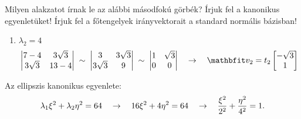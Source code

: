 \documentclass[exercise]{math-standalone}
\begin{document}
\begin{exercise}{%
    Milyen alakzatot írnak le az alábbi másodfokú görbék?
    Írjuk fel a kanonikus egyenletüket!
    Írjuk fel a főtengelyek irányvektorait a standard normális bázisban!
  }
{\begin{enumerate}[a)]
\begin{enumerate}[1)]
\[\begin{vmatrix}
                        -9         & 3 \sqrt{3} \\
                        3 \sqrt{3} & -3
                      \end{vmatrix} \;\sim\; \begin{vmatrix}
                        -\sqrt{3} & 1 \\
                        0         & 0
                      \end{vmatrix}
                      \quad \rightarrow \quad
                      \rvec v_1 = t_1 \begin{bmatrix}
                        1 \\ \sqrt{3}
                      \end{bmatrix}
                    \]
              \item $\lambda_2 = 4$
                    \[
                      \begin{vmatrix}
                        7 - 4      & 3 \sqrt{3} \\
                        3 \sqrt{3} & 13 - 4
                      \end{vmatrix} \;\sim\; \begin{vmatrix}
                        3          & 3 \sqrt{3} \\
                        3 \sqrt{3} & 9
                      \end{vmatrix} \;\sim\; \begin{vmatrix}
                        1 & \sqrt{3} \\
                        0 & 0
                      \end{vmatrix}
                      \quad \rightarrow \quad
                      \rvec v_2 = t_2 \begin{bmatrix}
                        -\sqrt{3} \\ 1
                      \end{bmatrix}
                    \]
            \end{enumerate}

            Az ellipszis kanonikus egyenlete:
            \[
              \lambda_1 \xi^2 + \lambda_2 \eta^2 = 64
              \quad \rightarrow \quad
              16 \xi^2 + 4 \eta^2 = 64
              \quad \rightarrow \quad
              \frac{\xi^2}{2^2} + \frac{\eta^2}{4^2} = 1
              \text.
            \]

            \begin{center}
            \end{center}
    \end{enumerate}
  }
\end{exercise}
\end{document}
